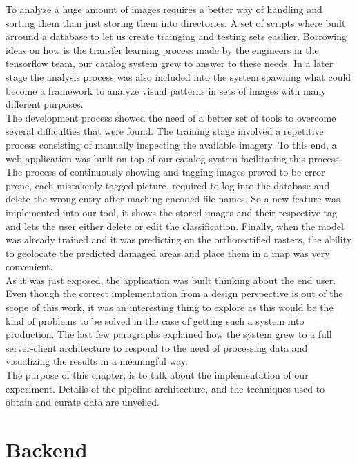 
To analyze a huge amount of images requires a better way of handling and sorting them than just storing them into directories. A set of scripts where built arround a database to let us create trainging and testing sets easilier. Borrowing ideas on how is the transfer learning process made by the engineers in the tensorflow team, our catalog system grew to answer to these needs. In a later stage the analysis process was also included into the system spawning what could become a framework to analyze visual patterns in sets of images with many different purposes.\\

The development process showed the need of a better set of tools to overcome several difficulties that were found. The training stage involved a repetitive process consisting of manually inspecting the available imagery. To this end, a web application was built on top of our catalog system facilitating this process. The process of continuously showing and tagging images proved to be error prone, each mistakenly tagged picture, required to log into the database and delete the wrong entry after maching encoded file names. So a new feature was implemented into our tool, it shows the stored images and their respective tag and lets the user either delete or edit the classification. Finally, when the model was already trained and it was predicting on the orthorectified rasters, the ability to geolocate the predicted damaged areas and place them in a map was very convenient.\\

As it was just exposed, the application was built thinking about the end user. Even though the correct implementation from a design perspective is out of the scope of this work, it was an interesting thing to explore as this would be the kind of problems to be solved in the case of getting such a system into production. The last few paragraphs explained how the system grew to a full server-client architecture to respond to the need of processing data and visualizing the results in a meaningful way.\\

The purpose of this chapter, is to talk about the implementation of our experiment. Details of the pipeline architecture, and the techniques used to obtain and curate data are unveiled.\\

\section{Backend}

